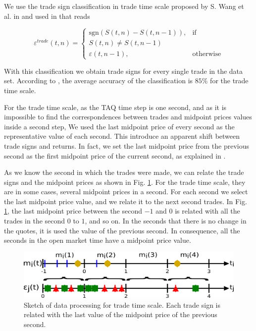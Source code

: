 We use the trade sign classification in trade time scale proposed by S. Wang et
al. in \cite{Wang_2016_cross} and used in
\cite{Wang_2016_avg,Wang_2017,Wang_2018_copulas} that reads

\begin{equation}\label{eq:trade_signs_trade}
    \varepsilon^{trade}\left(t,n\right)=\left\{
    \begin{array}{cc}
    \text{sgn}\left(S\left(t,n\right)-S\left(t,n-1\right)\right),
    & \text{if }\\ S\left(t,n\right) \ne S\left(t,n-1\right)\\
    \varepsilon\left(t,n-1\right),
    & \text{otherwise}
    \end{array}\right.
\end{equation}

With this classification we obtain trade signs for every single trade in the
data set. According to \cite{Wang_2016_cross}, the average accuracy of the
classification is $85\%$ for the trade time scale.

For the trade time scale, as the TAQ time step is one second, and as it is
impossible to find the correspondences between trades and midpoint prices
values inside a second step, We used the last midpoint price of every second as
the representative value of each second. This introduce an apparent shift
between trade signs and returns. In fact, we set the last midpoint price from
the previous second as the first midpoint price of the current second, as
explained in \cite{Wang_2016_cross}.

As we know the second in which the trades were made, we can relate the trade
signs and the midpoint prices as shown in Fig.
\ref{fig:relation_trades_midpoint_trade_scale}. For the trade time scale, they
are in some cases, several midpoint prices in a second. For each second we
select the last midpoint price value, and we relate it to the next second
trades. In Fig. \ref{fig:relation_trades_midpoint_trade_scale}, the last
midpoint price between the second $-1$ and $0$ is related with all the trades
in the second $0$ to $1$, and so on. In the seconds that there is no change in
the quotes, it is used the value of the previous second. In consequence, all
the seconds in the open market time have a midpoint price value.

\begin{figure}[htbp]
    \centering
    \includegraphics[width=\columnwidth]{figures/02_relation_trades_quotes_trade_scale.png}
    \caption{Sketch of data processing for trade time scale. Each trade sign is
             related with the last value of the midpoint price of the previous
             second.}
    \label{fig:relation_trades_midpoint_trade_scale}
\end{figure}

